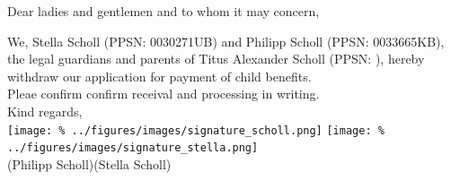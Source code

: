 \documentclass[
  fontsize=11pt,
  paper=a4,
  parskip=half,
  enlargefirstpage=on,    %
  fromalign=right,        %
  fromphone=on,           %
  fromrule=aftername,     %
  addrfield=off,           %
  backaddress=off,         %
  subject=beforeopening,  %
  locfield=narrow,        %
  foldmarks=on,           %
]{scrlttr2}
\begin{document}
\begin{letter}{}
  \opening{Dear ladies and gentlemen and to whom it may concern,}

  We, Stella Scholl (PPSN: 0030271UB) and Philipp Scholl (PPSN: 0033665KB), the legal guardians and parents of Titus Alexander Scholl (PPSN: ), hereby withdraw our application for payment of child benefits.\\%

  Pleae confirm confirm receival and processing in writing.\\%

  Kind regards,\\%
  \texttt{[image: \%
    ../figures/images/signature\_scholl.png]}%
  \hspace*{1.5cm}%
  \texttt{[image: \%
    ../figures/images/signature\_stella.png]}\\[-0.5cm]%
  (Philipp Scholl)\hspace*{2.5cm}(Stella Scholl)%

\end{letter}
\end{document}
